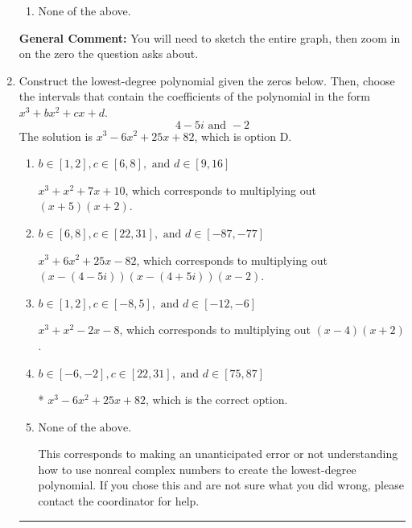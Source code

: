 \documentclass{extbook}[14pt]
\newcommand{\litem}[1]{\item #1

\rule{\textwidth}{0.4pt}}
\begin{document}
\begin{enumerate}
{\begin{enumerate}[label=\Alph*.]
\item None of the above.\end{enumerate}
\textbf{General Comment:} You will need to sketch the entire graph, then zoom in on the zero the question asks about.
}
\litem{
Construct the lowest-degree polynomial given the zeros below. Then, choose the intervals that contain the coefficients of the polynomial in the form $x^3+bx^2+cx+d$.
\[ 4 - 5 i \text{ and } -2 \]The solution is \( x^{3} -6 x^{2} +25 x + 82 \), which is option D.\begin{enumerate}[label=\Alph*.]
\item \( b \in [1, 2], c \in [6, 8], \text{ and } d \in [9, 16] \)

$x^{3} + x^{2} +7 x + 10$, which corresponds to multiplying out $(x + 5)(x + 2)$.
\item \( b \in [6, 8], c \in [22, 31], \text{ and } d \in [-87, -77] \)

$x^{3} +6 x^{2} +25 x -82$, which corresponds to multiplying out $(x-(4 - 5 i))(x-(4 + 5 i))(x -2)$.
\item \( b \in [1, 2], c \in [-8, 5], \text{ and } d \in [-12, -6] \)

$x^{3} + x^{2} -2 x -8$, which corresponds to multiplying out $(x -4)(x + 2)$.
\item \( b \in [-6, -2], c \in [22, 31], \text{ and } d \in [75, 87] \)

* $x^{3} -6 x^{2} +25 x + 82$, which is the correct option.
\item \( \text{None of the above.} \)

This corresponds to making an unanticipated error or not understanding how to use nonreal complex numbers to create the lowest-degree polynomial. If you chose this and are not sure what you did wrong, please contact the coordinator for help.
\end{enumerate}

}
\end{enumerate}
\end{document}
